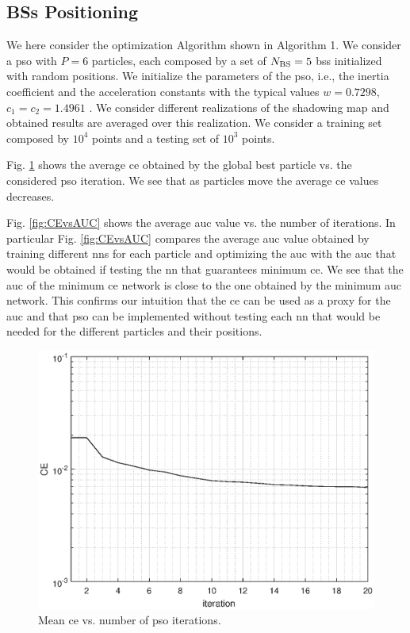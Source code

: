 \documentclass[twocolumns]{IEEEtran}
\begin{document}
\subsection{BSs Positioning}
We here consider the optimization Algorithm shown in Algorithm 1. We consider a \ac{pso} with $P=6$ particles, each composed by a set of $N_{\rm BS}=5$ \acp{bs} initialized with random positions. We initialize the parameters of the \ac{pso}, i.e., the inertia coefficient and the acceleration constants with the typical values $w=0.7298$, $c_1=c_2=1.4961$ \cite{Kennedy-11}. We consider different realizations of the shadowing map and obtained results are averaged over this realization. We consider a training set composed by $10^4$ points and a testing set of $10^3$ points.

Fig. \ref{fig:CE} shows the average \ac{ce} obtained by the global best particle vs. the considered \ac{pso} iteration. We see that as particles move the average \ac{ce} values decreases.

Fig. \ref{fig:CEvsAUC} shows the average \ac{auc} value vs. the number of iterations. In particular Fig. \ref{fig:CEvsAUC} compares the average \ac{auc} value obtained by training different \acp{nn} for each particle and optimizing the \ac{auc} with the \ac{auc} that would be obtained if testing the \ac{nn} that guarantees minimum \ac{ce}. We see that the \ac{auc} of the minimum \ac{ce} network is close to the one obtained by the minimum \ac{auc} network. This confirms our intuition that the \ac{ce} can be used as a proxy for the \ac{auc} and that \ac{pso} can be implemented without testing each \ac{nn} that would be needed for the different particles and their positions.

\begin{figure}[t]
    \centering
    \includegraphics[width=1\columnwidth]{CE_71_real.eps}
    \caption{Mean \ac{ce} vs. number of \ac{pso} iterations.}
    \label{fig:CE}
\end{figure}
\end{document}
